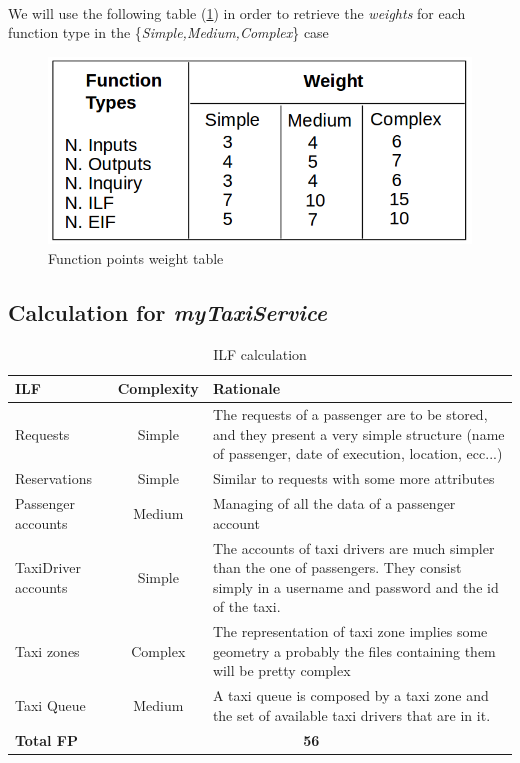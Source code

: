 \paragraph{} We will use the following table (\ref{fp:weightTable}) in order to retrieve the \textit{weights} for each function type in the \{\textit{Simple,Medium,Complex}\} case
\begin{figure}[H]
	\centering
	\includegraphics[scale = 0.5]{Size_Cost_Effort/fp_table}
	\caption{Function points weight table}
	\label{fp:weightTable}
\end{figure}

\subsection{Calculation for \textit{myTaxiService}}

\begin{table}[H]
\centering
\begin{tabular}{ l | c | p{} }
\textbf{ILF} & \textbf{Complexity} & \textbf{Rationale} \\ \hline
Requests & Simple & The requests of a passenger are to be stored, and they present a very simple structure (name of passenger, date of execution, location, ecc...) \\ \hline
Reservations & Simple & Similar to requests with some more attributes \\ \hline
Passenger accounts & Medium & Managing of all the data of a passenger account \\ \hline
TaxiDriver accounts & Simple & The accounts of taxi drivers are much simpler than the one of passengers. They consist simply in a username and password and the id of the taxi. \\ \hline
Taxi zones & Complex & The representation of taxi zone implies some geometry a probably the files containing them will be pretty complex \\ \hline
Taxi Queue & Medium & A taxi queue is composed by a taxi zone and the set of available taxi drivers that are in it. \\ \hline
\textbf{Total FP} & \multicolumn{2}{c}{\textbf{56}}
\end{tabular}
\caption{ILF calculation}
\end{table}

